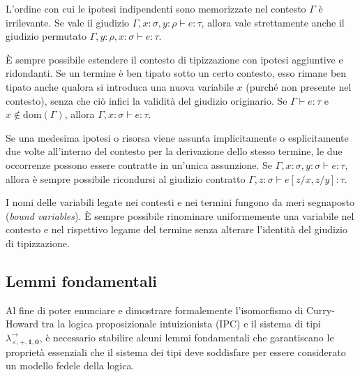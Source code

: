 \begin{axi}[Permutazione]
    L'ordine con cui le ipotesi indipendenti sono memorizzate nel contesto $\Gamma$ è irrilevante. Se vale il giudizio $\Gamma, x:\sigma, y:\rho \vdash e : \tau$, allora vale strettamente 
    anche il giudizio permutato $\Gamma, y:\rho, x:\sigma \vdash e : \tau $.
\end{axi}

\begin{axi}
    È sempre possibile estendere il contesto di tipizzazione con ipotesi aggiuntive e ridondanti. Se un termine è ben tipato sotto un certo contesto, esso rimane ben tipato anche qualora si 
    introduca una nuova variabile $x$ (purché non presente nel contesto), senza che ciò infici la validità del giudizio originario. Se $\Gamma \vdash e : \tau$ e $x \notin \text{dom}(\Gamma)$, 
    allora $\Gamma, x:\sigma \vdash e : \tau$.
\end{axi}

\begin{axi}
    Se una medesima ipotesi o risorsa viene assunta implicitamente o esplicitamente due volte all'interno del contesto per la derivazione dello stesso termine, le due occorrenze possono essere 
    contratte in un'unica assunzione. Se $\Gamma, x:\sigma, y:\sigma \vdash e : \tau$, allora è sempre possibile ricondursi al giudizio contratto $\Gamma, z:\sigma \vdash e[z/x, z/y] : \tau$.
\end{axi}

\begin{axi}
    I nomi delle variabili legate nei contesti e nei termini fungono da meri segnaposto (\emph{bound variables}). È sempre possibile rinominare uniformemente una variabile nel contesto e nel 
    rispettivo legame del termine senza alterare l'identità del giudizio di tipizzazione.
\end{axi}

\subsection{Lemmi fondamentali}
Al fine di poter enunciare e dimostrare formalemente l'isomorfismo di Curry-Howard tra la logica proposizionale intuizionista (IPC) e il sistema di tipi $\lambda^{\to}_{\times, +, \mathbf{1}, 
\mathbf{0}}$, è necessario stabilire alcuni lemmi fondamentali che garantiscano le proprietà essenziali che il sistema dei tipi deve soddisfare per essere considerato un modello fedele della logica.

